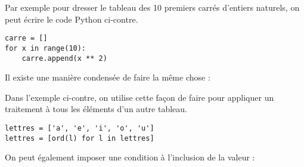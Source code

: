 \begin{multicols}{2}
Par exemple pour dresser le tableau des 10 premiers carrés d'entiers naturels, on peut écrire le code Python ci-contre.

\begin{verbatim}
carre = []
for x in range(10):
    carre.append(x ** 2)
\end{verbatim}
\end{multicols}

Il existe une manière condensée de faire la même chose :

\begin{multicols}{2}
Dans l'exemple ci-contre, on utilise cette façon de faire pour appliquer un traitement à tous les éléments d'un autre tableau.

\begin{verbatim}
lettres = ['a', 'e', 'i', 'o', 'u']
lettres = [ord(l) for l in lettres]
\end{verbatim}
\end{multicols}

On peut également imposer une condition à l'inclusion de la valeur : 

